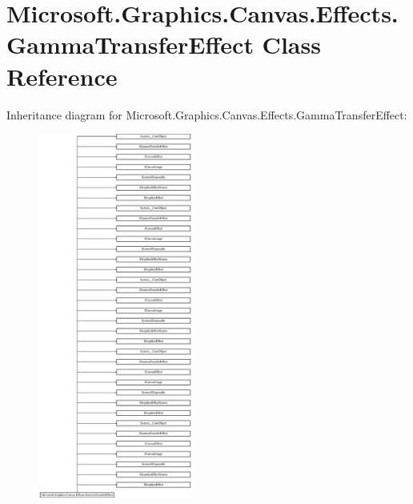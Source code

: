 \hypertarget{class_microsoft_1_1_graphics_1_1_canvas_1_1_effects_1_1_gamma_transfer_effect}{}\section{Microsoft.\+Graphics.\+Canvas.\+Effects.\+Gamma\+Transfer\+Effect Class Reference}
\label{class_microsoft_1_1_graphics_1_1_canvas_1_1_effects_1_1_gamma_transfer_effect}
Inheritance diagram for Microsoft.\+Graphics.\+Canvas.\+Effects.\+Gamma\+Transfer\+Effect\+:\begin{figure}[H]
\begin{center}
\leavevmode
\includegraphics[height=12.000000cm]{class_microsoft_1_1_graphics_1_1_canvas_1_1_effects_1_1_gamma_transfer_effect}
\end{center}
\end{figure}
